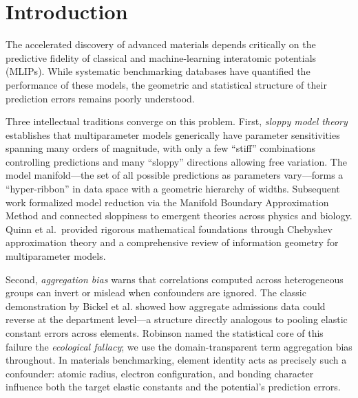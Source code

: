\documentclass[twocolumn,10pt]{article}
\begin{document}
\maketitle
\thispagestyle{plain}



\section{Introduction}

The accelerated discovery of advanced materials depends critically on the predictive fidelity of classical and machine-learning interatomic potentials (MLIPs)\cite{frederiksen2004,mortensen2005}. While systematic benchmarking databases have quantified the performance of these models\cite{kurniawan2022,openkim,choudhary2017jarvisff,chiang2025mliparena}, the geometric and statistical structure of their prediction errors remains poorly understood.

Three intellectual traditions converge on this problem. First, \textit{sloppy model theory} establishes that multiparameter models generically have parameter sensitivities spanning many orders of magnitude, with only a few ``stiff'' combinations controlling predictions and many ``sloppy'' directions allowing free variation\cite{brown2003,waterfall2006,gutenkunst2007}. The model manifold---the set of all possible predictions as parameters vary---forms a ``hyper-ribbon'' in data space with a geometric hierarchy of widths\cite{transtrum2010,transtrum2011,machta2013}. Subsequent work formalized model reduction via the Manifold Boundary Approximation Method\cite{transtrum2014} and connected sloppiness to emergent theories across physics and biology\cite{transtrum2015}. Quinn et al.\ provided rigorous mathematical foundations through Chebyshev approximation theory\cite{quinn2019} and a comprehensive review of information geometry for multiparameter models\cite{quinn2023}.

Second, \textit{aggregation bias} warns that correlations computed across heterogeneous groups can invert or mislead when confounders are ignored\cite{simpson1951,blyth1972,pearl2014}. The classic demonstration by Bickel et al.\cite{bickel1975} showed how aggregate admissions data could reverse at the department level---a structure directly analogous to pooling elastic constant errors across elements. Robinson\cite{robinson1950} named the statistical core of this failure the \textit{ecological fallacy}; we use the domain-transparent term aggregation bias throughout. In materials benchmarking, element identity acts as precisely such a confounder: atomic radius, electron configuration, and bonding character influence both the target elastic constants and the potential's prediction errors\cite{pearl2009}.
\end{document}
